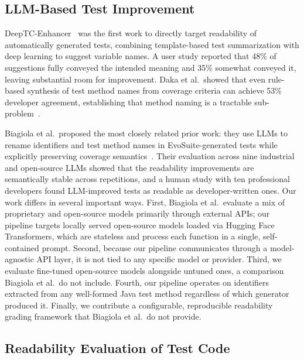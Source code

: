 \documentclass[conference]{IEEEtran}
\begin{document}
\subsection{LLM-Based Test Improvement}

DeepTC-Enhancer~\cite{roy2020deeptcenhancer} was the first work to directly
target readability of automatically generated tests, combining template-based
test summarization with deep learning to suggest variable names.
A user study reported that 48\% of suggestions fully conveyed the intended
meaning and 35\% somewhat conveyed it, leaving substantial room for improvement.
Daka et al.\ showed that even rule-based synthesis of test method names from
coverage criteria can achieve 53\% developer agreement, establishing that method
naming is a tractable sub-problem~\cite{daka2017generating}.

Biagiola et al.\ proposed the most closely related prior work: they use LLMs to
rename identifiers and test method names in EvoSuite-generated tests while
explicitly preserving coverage semantics~\cite{biagiola2025improving}.
Their evaluation across nine industrial and open-source LLMs showed that the
readability improvements are semantically stable across repetitions, and a
human study with ten professional developers found LLM-improved tests as
readable as developer-written ones.
Our work differs in several important ways.
First, Biagiola et al.\ evaluate a mix of proprietary and open-source models
primarily through external APIs; our pipeline targets locally served open-source
models loaded via Hugging Face Transformers, which are stateless and process
each function in a single, self-contained prompt.
Second, because our pipeline communicates through a model-agnostic API layer,
it is not tied to any specific model or provider.
Third, we evaluate fine-tuned open-source models alongside untuned ones, a
comparison Biagiola et al.\ do not include.
Fourth, our pipeline operates on identifiers extracted from any well-formed Java
test method regardless of which generator produced it.
Finally, we contribute a configurable, reproducible readability grading
framework that Biagiola et al.\ do not provide.

\subsection{Readability Evaluation of Test Code}
\end{document}
